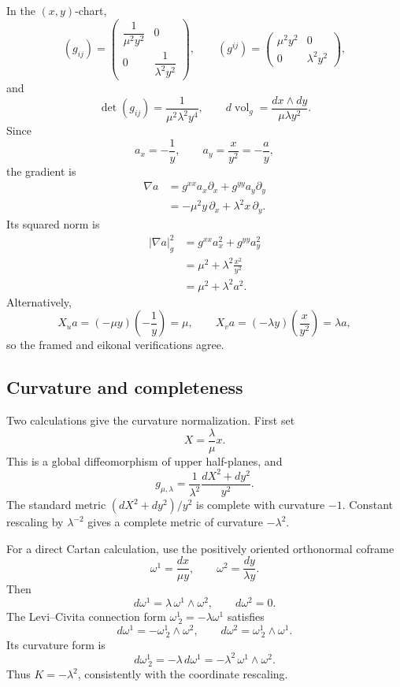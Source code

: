 In the \((x,y)\)-chart,
\[
 (g_{ij})
 =
 \begin{pmatrix}
  \dfrac1{\mu^2y^2}&0\\[5pt]
  0&\dfrac1{\lambda^2y^2}
 \end{pmatrix},
 \qquad
 (g^{ij})
 =
 \begin{pmatrix}
  \mu^2y^2&0\\
  0&\lambda^2y^2
 \end{pmatrix},
\]
and
\[
 \det(g_{ij})=\frac1{\mu^2\lambda^2y^4},
 \qquad
 d\operatorname{vol}_g
 =\frac{dx\wedge dy}{\mu\lambda y^2}.
\]
Since
\[
 a_x=-\frac1y,
 \qquad
 a_y=\frac{x}{y^2}=-\frac ay,
\]
the gradient is
\begin{align*}
 \nabla a
 &=g^{xx}a_x\partial_x+g^{yy}a_y\partial_y\\
 &=-\mu^2y\,\partial_x+\lambda^2x\,\partial_y.
\end{align*}
Its squared norm is
\begin{align*}
 |\nabla a|_g^2
 &=g^{xx}a_x^2+g^{yy}a_y^2\\
 &=\mu^2+\lambda^2\frac{x^2}{y^2}\\
 &=\mu^2+\lambda^2a^2.
\end{align*}
Alternatively,
\[
 X_u a=(-\mu y)\left(-\frac1y\right)=\mu,
 \qquad
 X_v a=(-\lambda y)\left(\frac{x}{y^2}\right)=\lambda a,
\]
so the framed and eikonal verifications agree.

\subsection{Curvature and completeness}

Two calculations give the curvature normalization.  First set
\[
 X=\frac{\lambda}{\mu}x.
\]
This is a global diffeomorphism of upper half-planes, and
\[
 g_{\mu,\lambda}
 =\frac1{\lambda^2}
  \frac{dX^2+dy^2}{y^2}.
\]
The standard metric \((dX^2+dy^2)/y^2\) is complete with curvature
\(-1\).  Constant rescaling by \(\lambda^{-2}\) gives a complete metric
of curvature \(-\lambda^2\).

For a direct Cartan calculation, use the positively oriented orthonormal coframe
\[
 \omega^1=\frac{dx}{\mu y},
 \qquad
 \omega^2=\frac{dy}{\lambda y}.
\]
Then
\[
 d\omega^1=\lambda\,\omega^1\wedge\omega^2,
 \qquad
 d\omega^2=0.
\]
The Levi--Civita connection form
\(\omega^1_{\ 2}=-\lambda\omega^1\) satisfies
\[
 d\omega^1=-\omega^1_{\ 2}\wedge\omega^2,
 \qquad
 d\omega^2=\omega^1_{\ 2}\wedge\omega^1.
\]
Its curvature form is
\[
 d\omega^1_{\ 2}
 =-\lambda\,d\omega^1
 =-\lambda^2\,\omega^1\wedge\omega^2.
\]
Thus \(K=-\lambda^2\), consistently with the coordinate rescaling.

